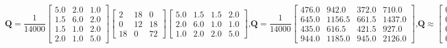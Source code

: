 \documentclass[shortabstract]{iithesis}
\begin{document}
\begin{subequations}
    \begin{equation*} 
        \textbf{Q} = \frac 1 {14000}  
    \left [\begin{array}{ccc}
         5.0 &     2.0 &     1.0\\
         1.5 &     6.0 &     2.0\\
         1.5 &     1.0 &     2.0\\
         2.0 &     1.0 &     5.0
    \end{array}\right]
    \left [ \begin{array}{ccc}
        2 &  18 &  0 \\
        0 &  12  &  18 \\
        18 &  0  &  72 
    \end{array} \right ]
    \left [\begin{array}{cccc}
         5.0 &     1.5 &     1.5 &     2.0\\
         2.0 &     6.0 &     1.0 &     1.0\\
         1.0 &     2.0 &     2.0 &     5.0
    \end{array}\right]\text{,}
    \end{equation*}
    \begin{equation*} 
        \textbf{Q} = \frac 1 {14000} \left [ \begin{array}{cccc}
           476.0 &   942.0 &   372.0 &   710.0\\
           645.0 &  1156.5 &   661.5 &  1437.0\\
           435.0 &   616.5 &   421.5 &   927.0\\
           944.0 &  1185.0 &   945.0 &  2126.0
    \end{array} \right ] \text{,}
    \end{equation*}
    \begin{equation*} 
        \textbf{Q}\approx \left [ \begin{array}{cccc}
          0.034000 &  0.067286 &  0.026571 &  0.050714\\
          0.046071 &  0.082607 &  0.047250 &  0.102643\\
          0.031071 &  0.044036 &  0.030107 &  0.066214\\
          0.067429 &  0.084643 &  0.067500 &  0.151857
    \end{array} \right ]\text{.}
\end{equation*}
\end{subequations}
\end{document}
